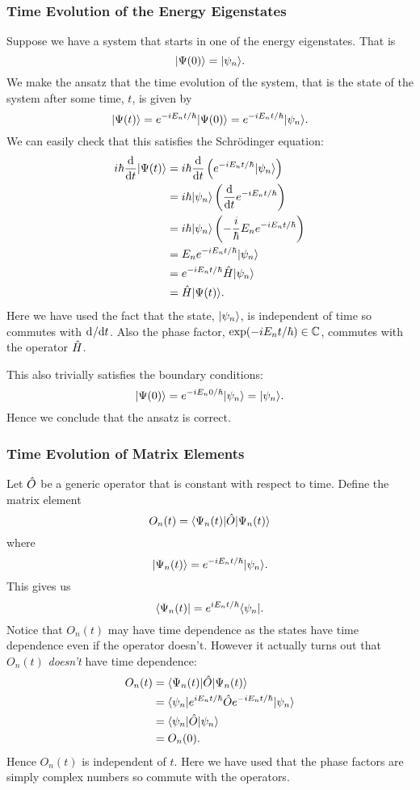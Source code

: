     \subsubsection{Time Evolution of the Energy Eigenstates}
    Suppose we have a system that starts in one of the energy eigenstates.
    That is
    \[\vert {\Psi(0)} \rangle = \vert {\psi_n} \rangle.\]
    We make the ansatz that the time evolution of the system, that is the state of the system after some time, \(t\), is given by
    \[\vert {\Psi(t)} \rangle = e^{-iE_nt/\hbar}\vert {\Psi(0)} \rangle = e^{-iE_nt/\hbar}\vert {\psi_n} \rangle.\]
    We can easily check that this satisfies the Schr\"odinger equation:
    \begin{align*}
        i\hbar\dv{t}\vert {\Psi(t)} \rangle &= i\hbar\dv{t}\left(e^{-iE_nt/\hbar}\vert {\psi_n} \rangle\right)\\
        &= i\hbar\vert {\psi_n} \rangle\left(\dv{t}e^{-iE_nt/\hbar}\right)\\
        &= i\hbar\vert {\psi_n} \rangle \left( -\frac{i}{\hbar}E_ne^{-iE_nt/\hbar} \right)\\
        &= E_ne^{-iE_nt/\hbar}\vert {\psi_n} \rangle\\
        &= e^{-iE_nt/\hbar}\hat{H}\vert {\psi_n} \rangle\\
        &= \hat{H}\vert {\Psi(t)} \rangle.
    \end{align*}
    Here we have used the fact that the state, \(\vert {\psi_n} \rangle\), is independent of time so commutes with \(\mathrm{d}^{}{}/\mathrm{d}{t}^{}\).
    Also the phase factor, \(\exp(-iE_nt/\hbar)\in\mathbb{C}\), commutes with the operator \(\hat{H}\).
    
    This also trivially satisfies the boundary conditions:
    \[\vert {\Psi(0)} \rangle = e^{-iE_n0/\hbar}\vert {\psi_n} \rangle = \vert {\psi_n} \rangle.\]
    Hence we conclude that the ansatz is correct.
    
    \subsubsection{Time Evolution of Matrix Elements}
    Let \(\hat{O}\) be a generic operator that is constant with respect to time.
    Define the matrix element
    \[O_n(t) = \langle {\Psi_n(t)} \vert\hat{O}\vert {\Psi_n(t)} \rangle\]
    where
    \[\vert {\Psi_n(t)} \rangle = e^{-iE_nt/\hbar}\vert {\psi_n} \rangle.\]
    This gives us
    \[\langle {\Psi_n(t)} \vert = e^{iE_nt/\hbar}\langle {\psi_n} \vert.\]
    Notice that \(O_n(t)\) may have time dependence as the states have time dependence even if the operator doesn't.
    However it actually turns out that \(O_n(t)\) \emph{doesn't} have time dependence:
    \begin{align*}
        O_n(t) &= \langle {\Psi_n(t)} \vert\hat{O}\vert {\Psi_n(t)} \rangle\\
        &= \langle {\psi_n} \vert e^{iE_nt/\hbar} \hat{O} e^{-iE_nt/\hbar} \vert {\psi_n} \rangle\\
        &= \langle {\psi_n} \vert\hat{O}\vert {\psi_n} \rangle\\
        &= O_n(0).
    \end{align*}
    Hence \(O_n(t)\) is independent of \(t\).
    Here we have used that the phase factors are simply complex numbers so commute with the operators.
    
